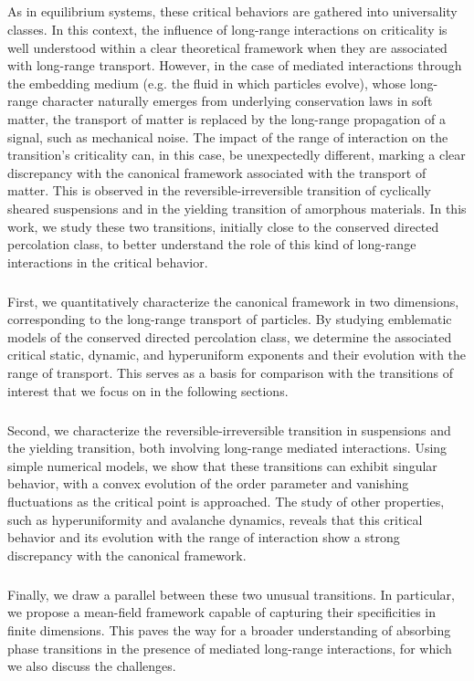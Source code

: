 \documentclass[10pt,a4paper]{article}
\begin{document}
\subparagraph{}As in equilibrium systems, these critical behaviors are gathered into universality classes. In this context, the influence of long-range interactions on criticality is well understood within a clear theoretical framework when they are associated with long-range transport. However, in the case of mediated interactions through the embedding medium (e.g. the fluid in which particles evolve), whose long-range character naturally emerges from underlying conservation laws in soft matter, the transport of matter is replaced by the long-range propagation of a signal, such as mechanical noise. The impact of the range of interaction on the transition's criticality can, in this case, be unexpectedly different, marking a clear discrepancy with the canonical framework associated with the transport of matter. This is observed in the reversible-irreversible transition of cyclically sheared suspensions and in the yielding transition of amorphous materials. In this work, we study these two transitions, initially close to the conserved directed percolation class, to better understand the role of this kind of long-range interactions in the critical behavior.

\subparagraph{}First, we quantitatively characterize the canonical framework in two dimensions, corresponding to the long-range transport of particles. By studying emblematic models of the conserved directed percolation class, we determine the associated critical static, dynamic, and hyperuniform exponents and their evolution with the range of transport. This serves as a basis for comparison with the transitions of interest that we focus on in the following sections.

\subparagraph{}Second, we characterize the reversible-irreversible transition in suspensions and the yielding transition, both involving long-range mediated interactions. Using simple numerical models, we show that these transitions can exhibit singular behavior, with a convex evolution of the order parameter and vanishing fluctuations as the critical point is approached. The study of other properties, such as hyperuniformity and avalanche dynamics, reveals that this critical behavior and its evolution with the range of interaction show a strong discrepancy with the canonical framework.

\subparagraph{}Finally, we draw a parallel between these two unusual transitions. In particular, we propose a mean-field framework capable of capturing their specificities in finite dimensions. This paves the way for a broader understanding of absorbing phase transitions in the presence of mediated long-range interactions, for which we also discuss the challenges.
\end{document}
